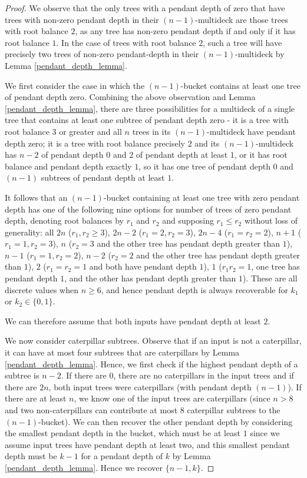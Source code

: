 \documentclass[10pt,a4paper]{amsart}
\begin{document}
\begin{proof}
    We observe that the only trees with a pendant depth of zero that have trees with non-zero pendant depth in their $(n-1)$-multideck are those trees with root balance $2$, as any tree has non-zero pendant depth if and only if it has root balance $1$. In the case of trees with root balance $2$, such a tree will have precisely two trees of non-zero pendant-depth in their $(n-1)$-multideck by Lemma \ref{pendant_depth_lemma}.

    We first consider the case in which the $(n-1)$-bucket contains at least one tree of pendant depth zero. Combining the above observation and Lemma \ref{pendant_depth_lemma}, there are three possibilities for a multideck of a single tree that contains at least one subtree of pendant depth zero - it is a tree with root balance $3$ or greater and all $n$ trees in its $(n-1)$-multideck have pendant depth zero; it is a tree with root balance precisely $2$ and its $(n-1)$-multideck has $n-2$ of pendant depth $0$ and $2$ of pendant depth at least $1$, or it has root balance and pendant depth exactly $1$, so it has one tree of pendant depth $0$ and $(n-1)$ subtrees of pendant depth at least $1$.

    It follows that an $(n-1)$-bucket containing at least one tree with zero pendant depth has one of the following nine options for number of trees of zero pendant depth, denoting root balances by $r_1$ and $r_2$ and supposing $r_1 \le r_2$ without loss of generality: all $2n$ ($r_1,r_2\ge 3$), $2n-2$ ($r_1=2,r_2=3$), $2n-4$ ($r_1=r_2=2$), $n+1$ ($r_1=1,r_2=3$), $n$ ($r_2=3$ and the other tree has pendant depth greater than $1$), $n-1$ ($r_1=1,r_2=2$), $n-2$ ($r_2=2$ and the other tree has pendant depth greater than $1$), $2$ ($r_1=r_2=1$ and both have pendant depth $1$), $1$ ($r_1r_2=1$, one tree has pendant depth $1$, and the other has pendant depth greater than $1$). These are all discrete values when $n \ge 6$, and hence pendant depth is always recoverable for $k_1$ or $k_2 \in \{0,1\}$.

    We can therefore assume that both inputs have pendant depth at least $2$.

    We now consider caterpillar subtrees. Observe that if an input is not a caterpillar, it can have at most four subtrees that are caterpillars by Lemma \ref{pendant_depth_lemma}. Hence, we first check if the highest pendant depth of a subtree is $n-2$. If there are $0$, there are no caterpillars in the input trees and if there are $2n$, both input trees were caterpillars (with pendant depth $(n-1)$). If there are at least $n$, we know one of the input trees are caterpillars (since $n>8$ and two non-caterpillars can contribute at most $8$ caterpillar subtrees to the $(n-1)$-bucket). We can then recover the other pendant depth by considering the smallest pendant depth in the bucket, which must be at least $1$ since we assume input trees have pendant depth at least two, and this smallest pendant depth must be $k-1$ for a pendant depth of $k$ by Lemma \ref{pendant_depth_lemma}. Hence we recover $\{n-1,k\}$.
    

\end{proof}
\end{document}
